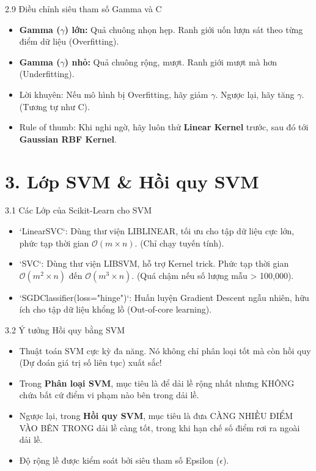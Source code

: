 \documentclass[aspectratio=169, 12pt]{beamer}
\begin{document}
\begin{frame}{2.9 Điều chỉnh siêu tham số Gamma và C}
    \begin{itemize}
        \item \textbf{Gamma ($\gamma$) lớn:} Quả chuông nhọn hẹp. Ranh giới uốn lượn sát theo từng điểm dữ liệu (Overfitting).
        \item \textbf{Gamma ($\gamma$) nhỏ:} Quả chuông rộng, mượt. Ranh giới mượt mà hơn (Underfitting).
        \item Lời khuyên: Nếu mô hình bị Overfitting, hãy giảm $\gamma$. Ngược lại, hãy tăng $\gamma$. (Tương tự như C).
        \item Rule of thumb: Khi nghi ngờ, hãy luôn thử \textbf{Linear Kernel} trước, sau đó tới \textbf{Gaussian RBF Kernel}.
    \end{itemize}
\end{frame}


\section{3. Lớp SVM \& Hồi quy SVM}

\begin{frame}{3.1 Các Lớp của Scikit-Learn cho SVM}
    \begin{itemize}
        \item `LinearSVC`: Dùng thư viện LIBLINEAR, tối ưu cho tập dữ liệu cực lớn, phức tạp thời gian $\mathcal{O}(m \times n)$. (Chỉ chạy tuyến tính).
        \item `SVC`: Dùng thư viện LIBSVM, hỗ trợ Kernel trick. Phức tạp thời gian $\mathcal{O}(m^2 \times n)$ đến $\mathcal{O}(m^3 \times n)$. (Quá chậm nếu số lượng mẫu > 100,000).
        \item `SGDClassifier(loss="hinge")`: Huấn luyện Gradient Descent ngẫu nhiên, hữu ích cho tập dữ liệu khổng lồ (Out-of-core learning).
    \end{itemize}
\end{frame}

\begin{frame}{3.2 Ý tưởng Hồi quy bằng SVM}
    \begin{itemize}
        \item Thuật toán SVM cực kỳ đa năng. Nó không chỉ phân loại tốt mà còn hồi quy (Dự đoán giá trị số liên tục) xuất sắc!
        \item Trong \textbf{Phân loại SVM}, mục tiêu là để dải lề rộng nhất nhưng KHÔNG chứa bất cứ điểm vi phạm nào bên trong dải lề.
        \item Ngược lại, trong \textbf{Hồi quy SVM}, mục tiêu là đưa CÀNG NHIỀU ĐIỂM VÀO BÊN TRONG dải lề càng tốt, trong khi hạn chế số điểm rơi ra ngoài dải lề.
        \item Độ rộng lề được kiểm soát bởi siêu tham số Epsilon ($\epsilon$).
    \end{itemize}
\end{frame}
\end{document}

